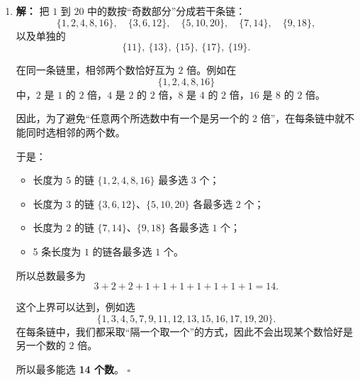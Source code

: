 \documentclass[11pt,a4paper,fontset=fandol]{ctexart}
\theoremstyle{formalexample}
\newenvironment{solution}{\par\noindent\textbf{解：}}{\hfill$\square$\par}
\begin{document}
\begin{enumerate}
\begin{solution}
  即
  \[
  19\ge 3(k-1).
  \]

  所以
  \[
  k-1\le 6,
  \qquad
  k\le 7.
  \]

  这个上界可以达到，例如选
  \[
  1,4,7,10,13,16,19.
  \]
  任意两个相邻所选数的差都正好是 $3$，因此满足条件。

  所以最多能选 \textbf{7 个数}。
  \end{solution}

  \item \begin{solution}
  把 $1$ 到 $20$ 中的数按“奇数部分”分成若干条链：
  \[
  \{1,2,4,8,16\},\quad \{3,6,12\},\quad \{5,10,20\},\quad \{7,14\},\quad \{9,18\},
  \]
  以及单独的
  \[
  \{11\},\ \{13\},\ \{15\},\ \{17\},\ \{19\}.
  \]

  在同一条链里，相邻两个数恰好互为 $2$ 倍。例如在
  \[
  \{1,2,4,8,16\}
  \]
  中，$2$ 是 $1$ 的 $2$ 倍，$4$ 是 $2$ 的 $2$ 倍，$8$ 是 $4$ 的 $2$ 倍，$16$ 是 $8$ 的 $2$ 倍。

  因此，为了避免“任意两个所选数中有一个是另一个的 $2$ 倍”，在每条链中就不能同时选相邻的两个数。

  于是：
  \begin{itemize}
    \item 长度为 $5$ 的链 $\{1,2,4,8,16\}$ 最多选 $3$ 个；
    \item 长度为 $3$ 的链 $\{3,6,12\}$、$\{5,10,20\}$ 各最多选 $2$ 个；
    \item 长度为 $2$ 的链 $\{7,14\}$、$\{9,18\}$ 各最多选 $1$ 个；
    \item 5 条长度为 $1$ 的链各最多选 $1$ 个。
  \end{itemize}

  所以总数最多为
  \[
  3+2+2+1+1+1+1+1+1+1=14.
  \]

  这个上界可以达到，例如选
  \[
  \{1,3,4,5,7,9,11,12,13,15,16,17,19,20\}.
  \]
  在每条链中，我们都采取“隔一个取一个”的方式，因此不会出现某个数恰好是另一个数的 $2$ 倍。

  所以最多能选 \textbf{14 个数}。
  \end{solution}
\end{enumerate}
\end{document}

